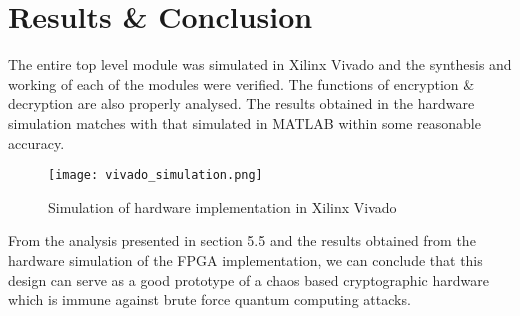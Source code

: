 \chapter{Results \& Conclusion}
\label{chap:conclusion}
\setlength{\parskip}{1.5mm}

The entire top level module was simulated in Xilinx Vivado and the synthesis and working of each of the modules were verified. The functions of encryption \& decryption are also properly analysed. The results obtained in the hardware simulation matches with that simulated in MATLAB within some reasonable accuracy.

\begin{figure}[H]
\centering
\texttt{[image: vivado\_simulation.png]}
\caption{Simulation of hardware implementation  in Xilinx Vivado}\label{fig:vivado_simulation}
\end{figure}

From the analysis presented in section 5.5 and the results obtained from the hardware simulation of the FPGA implementation, we can conclude that this design can serve as a good prototype of a chaos based cryptographic hardware which is immune against brute force quantum computing attacks.
